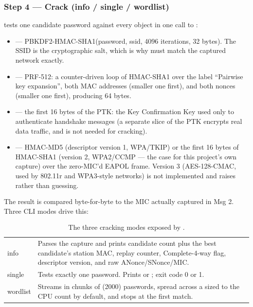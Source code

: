 \subsubsection{Step 4 --- Crack (info / single / wordlist)}
 tests one candidate password against every  object in one call to :

\begin{itemize}
\item {} --- PBKDF2-HMAC-SHA1(password, ssid, 4096 iterations, 32 bytes). The SSID is the cryptographic salt, which is why  must match the captured network exactly.
\item {} --- PRF-512: a counter-driven loop of HMAC-SHA1 over the label ``Pairwise key expansion'', both MAC addresses (smaller one first), and both nonces (smaller one first), producing 64 bytes.
\item {} --- the first 16 bytes of the PTK: the Key Confirmation Key used only to authenticate handshake messages (a separate slice of the PTK encrypts real data traffic, and is not needed for cracking).
\item {} --- HMAC-MD5 (descriptor version 1, WPA/TKIP) or the first 16 bytes of HMAC-SHA1 (version 2, WPA2/CCMP --- the case for this project's own capture) over the zero-MIC'd EAPOL frame. Version 3 (AES-128-CMAC, used by 802.11r and WPA3-style networks) is not implemented and raises  rather than guessing.
\end{itemize}

The result is compared byte-for-byte to the MIC actually captured in Msg 2. Three CLI modes drive this:

\begin{table}[H]\centering\small
\setlength{\tabcolsep}{9pt}
\begin{tabularx}{\textwidth}{@{}>{\ttfamily}l L{12.2cm}@{}}
\toprule
{} &  \\
\midrule
info & Parses the capture and prints candidate count plus the best candidate's station MAC, replay counter, Complete-4-way flag, descriptor version, and raw ANonce/SNonce/MIC. \\
single & Tests exactly one password. Prints  or ; exit code 0 or 1. \\
wordlist & Streams  in chunks of  (2000) passwords, spread across a  sized to the CPU count by default, and stops at the first match. \\
\bottomrule
\end{tabularx}
\caption{The three cracking modes exposed by .}
\end{table}

